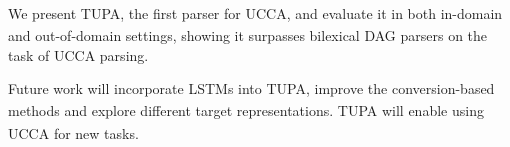 \documentclass[a0,portrait]{a0poster}
\newcommand{\parser}[1]{TUPA\textsubscript{#1}}
\begin{document}
\begin{multicols}{2}
We present \parser{}, the first parser for UCCA, and
evaluate it in both in-domain and out-of-domain settings,
showing it surpasses bilexical DAG parsers on the task of UCCA parsing.

Future work will incorporate LSTMs into \parser{},
improve the conversion-based methods and explore different target representations.
\parser{} will enable using UCCA for new tasks.


\color{DarkSlateGray} %
\tiny






\end{multicols}
\end{document}
